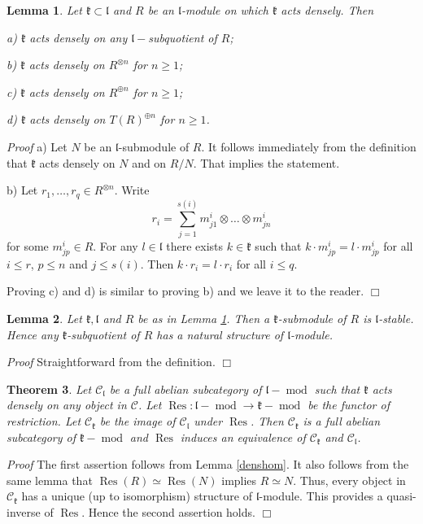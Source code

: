 \documentclass{svmult}
\newtheorem{theo}{Theorem}[section]
\newtheorem{lem}[theo]{Lemma}
\renewenvironment{proof}{ \emph{Proof}}{$\Box$}
\newcommand{\kk}{\mathfrak{k}}
\renewcommand{\ll}{\mathfrak{l}}
\begin{document}
\begin{lem}\label{densprop} Let $\kk\subset\ll$ and $R$ be an $\ll$-module on which $\kk$ acts densely. Then 

a) $\kk$ acts densely on any $\ll-$subquotient of $R$;

b) $\kk$ acts densely on $R^{\otimes n}$ for $n \geq 1$;

c)  $\kk$ acts densely on $R^{\oplus n}$ for $n \geq 1$;

d)  $\kk$ acts densely on $T(R)^{\oplus n}$ for $n \geq 1$.
\end{lem}
\begin{proof} a) Let $N$ be an $\ll$-submodule of $R$. It follows immediately from the definition that $\kk$ acts densely on $N$
and on $R/N$. That implies the statement.

b) Let $r_1,\dots, r_q\in R^{\otimes n}$. Write 
$$r_i=\sum_{j=1}^{s(i)}m^i_{j1}\otimes\dots\otimes m^i_{jn}$$
for some $m^i_{jp}\in R$. For any $l\in \ll$ there exists $k\in\kk$ such that $k \cdot m^i_{jp} = l \cdot m^i_{jp}$ for all $i\leq r$, $p\leq n$ and $j\leq s(i)$.
Then $k \cdot r_i = l \cdot r_i$ for all $i\leq q$.

Proving c) and d) is similar to proving b) and we leave it to the reader.
\end{proof}

\begin{lem}\label{densprop1} Let $\kk, \ll$ and $R$ be as in Lemma \ref{densprop}. Then a $\kk$-submodule of $R$ is $\ll$-stable. Hence any $\kk$-subquotient of $R$ has a natural structure of $\ll$-module.
\end{lem}
\begin{proof} Straightforward from the definition.
\end{proof}

\begin{theo}\label{theodense} Let $\mathcal C_\ll$ be a full abelian subcategory of $\ll-\operatorname{mod}$ such that $\kk$ acts densely on any object in $\mathcal C$.
Let $\operatorname {Res}:\ll-\operatorname{mod}\to \kk-\operatorname{mod}$ be the functor of restriction. Let $\mathcal C_\kk$ be the image of  $\mathcal C_\ll$ 
under  $\operatorname {Res}$. Then  $\mathcal C_\kk$ is a  full abelian subcategory of $\kk-\operatorname{mod}$ and $\operatorname{Res}$ induces an equivalence of $\mathcal C_{\kk}$ and $\mathcal C_{\ll}$.
\end{theo}

\begin{proof}
The first assertion follows from Lemma \ref{denshom}. It also follows from the same lemma that  $\operatorname{Res}(R)\simeq \operatorname{Res}(N)$
implies $R\simeq N$. Thus, every object in  $\mathcal C_\kk$ has a unique (up to isomorphism) structure of $\ll$-module. This provides a quasi-inverse of 
$\operatorname{Res}$. Hence the second assertion holds.
\end{proof}
\end{document}
